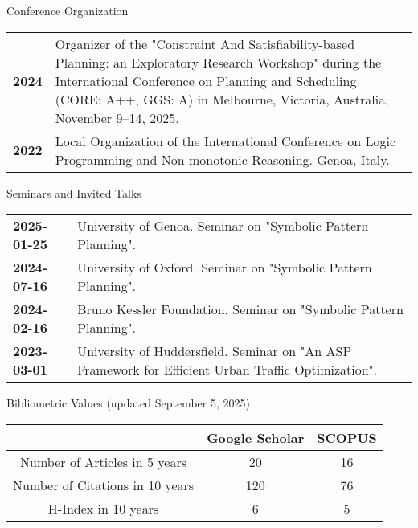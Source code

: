 \documentclass{resume} %
\begin{document}
   \begin{rSection}{Conference Organization}
	\begin{tabularx}{0.95\textwidth} {lp{14cm}}
 \textbf{2024} & Organizer of the "Constraint And Satisfiability-based Planning: an Exploratory Research Workshop" during the International Conference on Planning and Scheduling (CORE: A++, GGS: A) in Melbourne, Victoria, Australia, November 9–14, 2025. \\
  \textbf{2022} & Local Organization of the International Conference on Logic Programming and Non-monotonic Reasoning. Genoa, Italy.
  \end{tabularx}
 \end{rSection}


 \begin{rSection}{Seminars and Invited Talks}
 	\begin{tabularx}{0.95\textwidth} {lp{14cm}}
 \textbf{2025-01-25} & University of Genoa. Seminar on "Symbolic Pattern Planning".\\
 \textbf{2024-07-16} & University of Oxford. Seminar on "Symbolic Pattern Planning".\\
 \textbf{2024-02-16} & Bruno Kessler Foundation. Seminar on "Symbolic Pattern Planning".\\
 \textbf{2023-03-01} & University of Huddersfield. Seminar on "An ASP Framework for Efficient Urban Traffic Optimization".\\
 \end{tabularx}

\end{rSection}

\break
\begin{rSection}{Bibliometric Values \tiny{(updated September 5, 2025)}}
\begin{center}
	
\begin{tabular}{ccc}

 & Google Scholar & SCOPUS \\ \hline
\multicolumn{1}{c}{Number of Articles in 5 years} & 20 & 16 \\ \hline
\multicolumn{1}{c}{Number of Citations in 10 years} & 120 & 76 \\ \hline
\multicolumn{1}{c}{H-Index in 10 years} & 6 & 5 \\ 
\end{tabular}%
\end{center}
\end{rSection}
\end{document}
